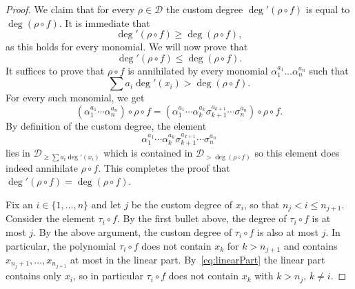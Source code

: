 \documentclass[a4paper,11pt,reqno]{amsart}
\newcommand{\calD}{\mathcal{D}}
\numberwithin{equation}{section}
\theoremstyle{definition}
\theoremstyle{plain}
\theoremstyle{remark}
\begin{document}
\begin{proof}
        {We claim that} for every $\rho\in \calD$ the custom degree $\deg'(\rho\circ
        f)$
        is equal to
        $\deg(\rho \circ f)$. It is {immediate} that \[\deg'(\rho\circ f) \geq
        \deg(\rho \circ f),\] as this holds for every monomial. We will now
        prove that \[\deg'(\rho\circ f) \leq
        \deg(\rho\circ f).\]
        It suffices to prove that
        $\rho\circ f$ is annihilated
        by every monomial
        $\alpha_1^{a_1} \ldots \alpha_n^{a_n}$ such that \[\sum a_i \deg'(x_i) >
        \deg(\rho \circ f).\]
        For every such monomial, we get
        \[
            (\alpha_1^{a_1} {\cdots} \alpha_n^{a_n})\circ\rho \circ f =
            (\alpha_1^{a_1} {\cdots} \alpha_k^{a_k} \sigma_{k+1}^{a_{k+1}} {\cdots}
            \sigma_{n}^{a_{n}}) \circ \rho \circ f.
        \]
        By definition of the custom degree, the element \[
        \alpha_1^{a_1} {\cdots} \alpha_k^{a_k} \sigma_{k+1}^{a_{k+1}} {\cdots}
        \sigma_{n}^{a_{n}}\] lies in $\calD_{\geq \sum a_i \deg'(x_i)}$ which is
        contained in $\calD_{>\deg(\rho\circ f)}$ so this element {does indeed annihilate} $\rho \circ f$. This {completes} the proof that $\deg'(\rho
        \circ f) =
        \deg(\rho\circ f)$.

        Fix an $i\in \{1, \ldots ,n\}$ and let $j$ be the custom degree of $x_i$, so
        that $n_j < i\leq n_{j+1}$.
        Consider the element $\tau_i\circ f$. By {the first bullet} above, the degree of $\tau_i\circ f$ is
        at most $j$. By the above argument, {the custom degree of
        $\tau_i\circ f$ is also at most $j$}. In particular, the polynomial $\tau_i \circ f$
        does not contain $x_{k}$ for $k > n_{j+1}$ and contains
        $x_{n_{j}+1}, \ldots ,x_{n_{j+1}}$ at most in the linear part.
        By~\eqref{eq:linearPart} the linear part contains only $x_{i}$, so in
        particular $\tau_i \circ f$ does not contain $x_k$ with $k>n_j$,
        $k\neq i$.


\end{proof}
\end{document}
